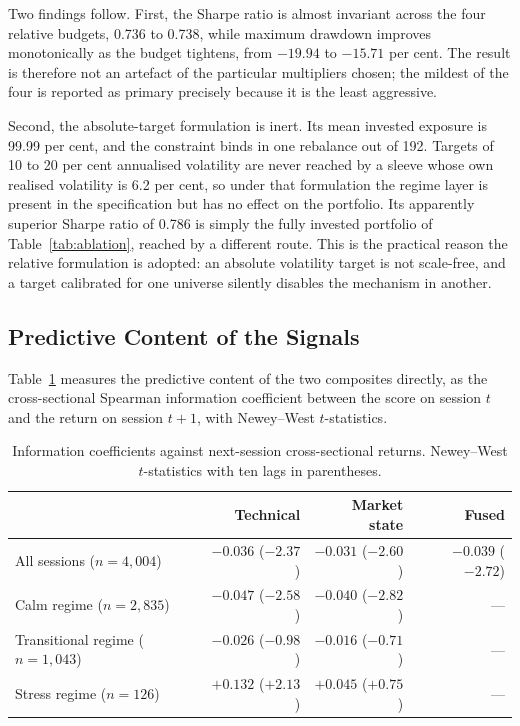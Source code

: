 \documentclass{singlecol-new}
\theoremstyle{TH}{
\newtheorem{lemma}{Lemma}
\newtheorem{theorem}[lemma]{Theorem}
\newtheorem{corrolary}[lemma]{Corrolary}
\newtheorem{conjecture}[lemma]{Conjecture}
\newtheorem{proposition}[lemma]{Proposition}
\newtheorem{claim}[lemma]{Claim}
\newtheorem{stheorem}[lemma]{Wrong Theorem}
\newtheorem{algorithm}{Algorithm}
}
\theoremstyle{THrm}{
\newtheorem{definition}{Definition}[section]
\newtheorem{question}{Question}[section]
\newtheorem{remark}{Remark}
\newtheorem{scheme}{Scheme}
}
\theoremstyle{THhit}{
\newtheorem{case}{Case}[section]
}
\begin{document}
Two findings follow. First, the Sharpe ratio is almost invariant across the four
relative budgets, 0.736 to 0.738, while maximum drawdown improves monotonically as the
budget tightens, from $-19.94$ to $-15.71$ per cent. The result is therefore not an
artefact of the particular multipliers chosen; the mildest of the four is reported as
primary precisely because it is the least aggressive.

Second, the absolute-target formulation is inert. Its mean invested exposure is 99.99
per cent, and the constraint binds in one rebalance out of 192. Targets of 10 to 20 per
cent annualised volatility are never reached by a sleeve whose own realised volatility
is 6.2 per cent, so under that formulation the regime layer is present in the
specification but has no effect on the portfolio. Its apparently superior Sharpe ratio
of 0.786 is simply the fully invested portfolio of Table~\ref{tab:ablation}, reached by a different
route. This is the practical reason the relative formulation is adopted: an absolute
volatility target is not scale-free, and a target calibrated for one universe silently
disables the mechanism in another.

\subsection{Predictive Content of the Signals}
\label{sec:ic}

Table~\ref{tab:ic} measures the predictive content of the two composites directly, as the
cross-sectional Spearman information coefficient between the score on session $t$ and
the return on session $t+1$, with Newey--West $t$-statistics.

\begin{table}[!ht]
\centering
\caption{Information coefficients against next-session cross-sectional returns.
Newey--West $t$-statistics with ten lags in parentheses.}
\label{tab:ic}
\small
\begin{tabular}{p{3.8cm}rrr}
\hline
& \textbf{Technical} & \textbf{Market state} & \textbf{Fused} \\
\hline
All sessions ($n=4{,}004$) & $-0.036$ ($-2.37$) & $-0.031$ ($-2.60$) & $-0.039$ ($-2.72$) \\
Calm regime ($n=2{,}835$) & $-0.047$ ($-2.58$) & $-0.040$ ($-2.82$) & --- \\
Transitional regime ($n=1{,}043$) & $-0.026$ ($-0.98$) & $-0.016$ ($-0.71$) & --- \\
Stress regime ($n=126$) & $+0.132$ ($+2.13$) & $+0.045$ ($+0.75$) & --- \\
\hline
\end{tabular}
\end{table}
\end{document}
